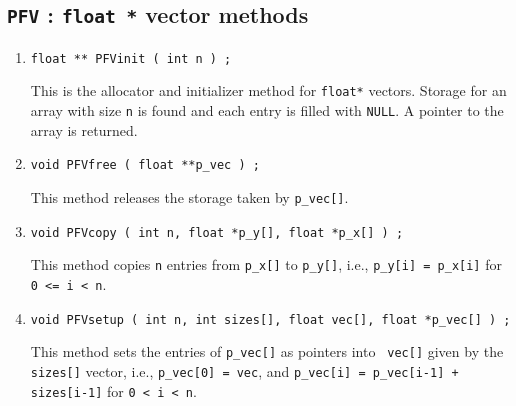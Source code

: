 \par
\subsection{{\tt PFV} : {\tt float *} vector methods}
\label{subsection:Utilities:proto:PFV}
\par
\begin{enumerate}
\item
\begin{verbatim}
float ** PFVinit ( int n ) ;
\end{verbatim}
This is the allocator and initializer method for {\tt float*} vectors.
Storage for an array with size {\tt n} is found and each
entry is filled with {\tt NULL}.
A pointer to the array is returned.
\item
\begin{verbatim}
void PFVfree ( float **p_vec ) ;
\end{verbatim}
This method releases the storage taken by {\tt p\_vec[]}.
\item
\begin{verbatim}
void PFVcopy ( int n, float *p_y[], float *p_x[] ) ;
\end{verbatim}
This method copies {\tt n} entries from {\tt p\_x[]} to {\tt p\_y[]},
i.e.,
{\tt p\_y[i] = p\_x[i]} for {\tt 0 <= i < n}.
\item
\begin{verbatim}
void PFVsetup ( int n, int sizes[], float vec[], float *p_vec[] ) ;
\end{verbatim}
This method sets the entries of {\tt p\_vec[]} as pointers into {\tt
vec[]} given by the {\tt sizes[]} vector,
i.e.,
{\tt p\_vec[0] = vec}, and 
{\tt p\_vec[i] = p\_vec[i-1] + sizes[i-1]} 
for {\tt 0 < i < n}.
\end{enumerate}
